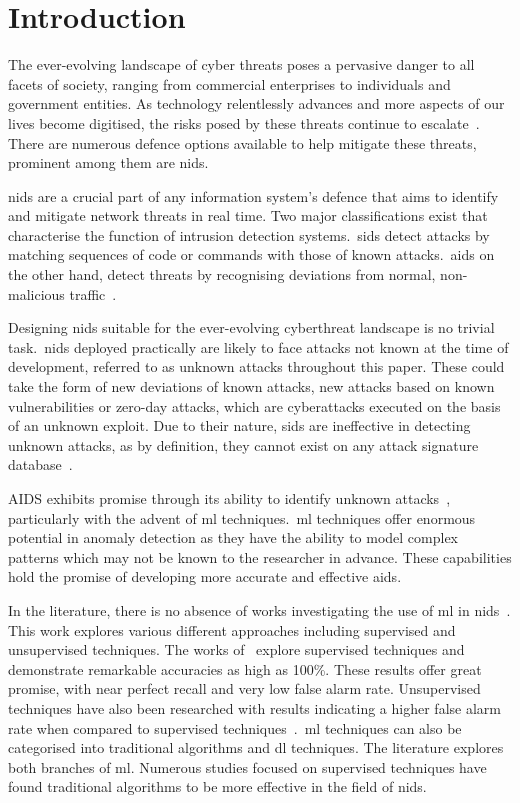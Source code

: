 \chapter{Introduction}%
\label{chp:introduction}


The ever-evolving landscape of cyber threats poses a pervasive danger to all
facets of society, ranging from commercial enterprises to individuals and
government entities. As technology relentlessly advances and more aspects of
our lives become digitised, the risks posed by these threats continue to
escalate~\cite{ENISA}. There are numerous defence options available to help
mitigate these threats, prominent among them are \gls{nids}.

\gls{nids} are a crucial part of any information system's defence that aims to
identify and mitigate network threats in real time. Two major classifications
exist that characterise the function of intrusion detection systems.\ \gls{sids}
detect attacks by matching sequences of code or commands with those of known
attacks.\ \gls{aids} on the other hand, detect threats by recognising
deviations from normal, non-malicious traffic~\cite{survey1}.

Designing \gls{nids} suitable for the ever-evolving cyberthreat landscape is no
trivial task.\ \gls{nids} deployed practically are likely to face attacks not
known at the time of development, referred to as unknown attacks throughout this
paper. These could take the form of new deviations of known attacks, new
attacks based on known vulnerabilities or zero-day attacks, which are
cyberattacks executed on the basis of an unknown exploit. Due to their nature,
\gls{sids} are ineffective in detecting unknown attacks, as by definition, they
cannot exist on any attack signature database~\cite{survey1}.

AIDS exhibits promise through its ability to identify unknown
attacks~\cite{aids-unknown}, particularly with the advent of \gls{ml}
techniques.\ \gls{ml} techniques offer enormous potential in anomaly detection
as they have the ability to model complex patterns which may not be known to
the researcher in advance. These capabilities hold the promise of developing
more accurate and effective \gls{aids}.

In the literature, there is no absence of works investigating the use of
\gls{ml} in \gls{nids}~\cite{Karatas, Jiang, Mighan, Pu, Cao, Atefinia}. This
work explores various different approaches including supervised and
unsupervised techniques. The works of~\cite{Karatas, Jiang, Mighan, Atefinia}
explore supervised techniques and demonstrate remarkable accuracies as high as
100\%. These results offer great promise, with near perfect recall and very low
false alarm rate. Unsupervised techniques have also been researched with
results indicating a higher false alarm rate when compared to supervised
techniques~\cite{Zoppi}.\ \gls{ml} techniques can also be categorised into
traditional algorithms and \gls{dl} techniques. The literature explores both
branches of \gls{ml}. Numerous studies focused on supervised techniques have
found traditional algorithms to be more effective in the field of \gls{nids}. %

